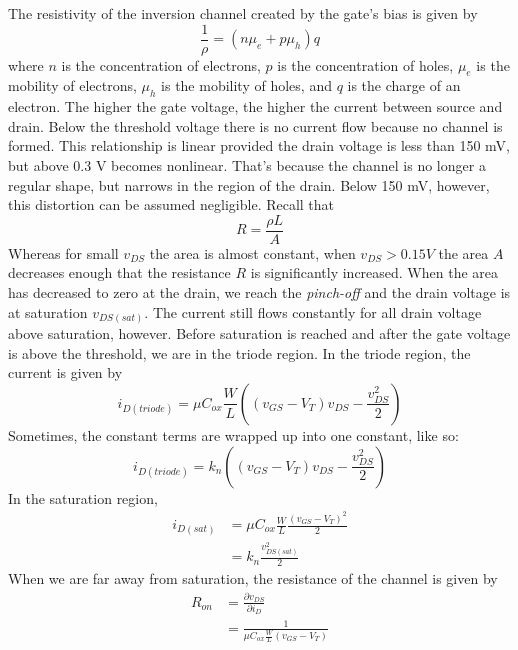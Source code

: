 \documentclass[nobib]{tufte-handout}
\begin{document}
The resistivity of the inversion channel created by the gate's bias
is given by 
\begin{equation}
    \frac{1}{\rho} = (n\mu_e + p\mu_h)q
\end{equation}
where $n$ is the concentration of electrons, 
$p$ is the concentration of holes, $\mu_e$ is
the mobility of electrons, $\mu_h$ is the 
mobility of holes, and $q$ is the charge of an electron. 
The higher the gate voltage, the higher the current between source and drain. 
Below the threshold voltage there is no current flow because no 
channel is formed. This relationship is linear provided the drain voltage 
is less than 150 mV, but above 0.3 V becomes nonlinear. That's because 
the channel is no longer a regular shape, but narrows in the region of the 
drain. Below 150 mV, however, this distortion can be assumed negligible. 
Recall that 
\begin{equation}
    R = \frac{\rho L}{A}
\end{equation}
Whereas for small $v_{DS}$ the area is almost constant, 
when $v_{DS} > 0.15 V$ the area $A$ decreases enough that 
the resistance $R$ is significantly increased. When the area has 
decreased to zero at the drain, we reach the \emph{pinch-off} and 
the drain voltage is at saturation $v_{DS(sat)}$. The current still 
flows constantly for all drain voltage above saturation, however. 
Before saturation is reached and after the gate voltage is above the threshold, 
we are in the triode region. In the triode region, the current is given by 
\begin{equation}
    i_{D(triode)} = \mu C_{ox} \frac{W}{L} ((v_{GS}-V_T)v_{DS}-\frac{v^2_{DS}}{2})
\end{equation}
Sometimes, the constant terms are wrapped up into 
one constant, like so:
\begin{equation}
    i_{D(triode)} = k_n ((v_{GS}-V_T)v_{DS}-\frac{v^2_{DS}}{2})
\end{equation}
In the saturation region, 
\begin{align}
    i_{D(sat)} &= \mu C_{ox} \frac{W}{L} \frac{(v_{GS}-V_T)^2}{2} \\
    &= k_n \frac{v^2_{DS(sat)}}{2}
\end{align}
When we are far away from saturation, 
the resistance of the channel is given by 
\begin{align}
    R_{on} &= \frac{\partial v_{DS}}{\partial i_D} \\
    &= \frac{1}{\mu C_{ox} \frac{W}{L} (v_{GS} - V_T)}
\end{align}
\end{document}
